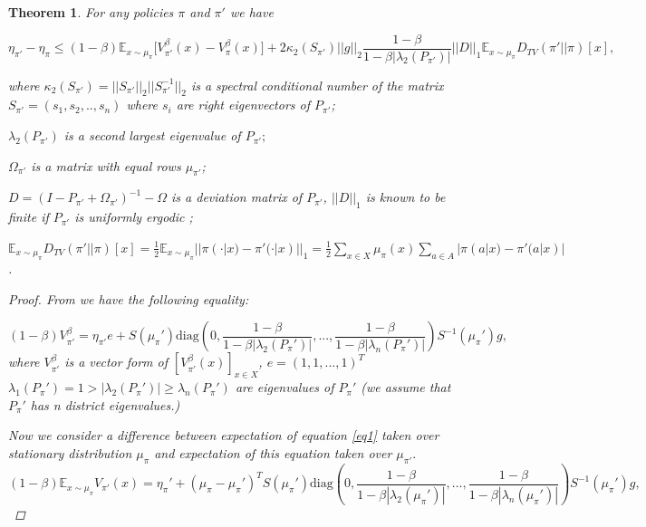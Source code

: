 \documentclass[11pt]{article}
\newcommand{\E}{\mathbb{E}}
\newtheorem{theorem}{Theorem}
\theoremstyle{definition}
\numberwithin{equation}{section}
\begin{document}
\begin{theorem}\label{thm2}
For any policies $\pi$ and $\pi'$ we have

\begin{equation}
\eta_{\pi'}-\eta_\pi  \leq  (1-\beta) \E_{x\sim\mu_\pi} \Big[V^\beta_{\pi'}(x) -V^\beta_{\pi}(x)\Big] + 2\kappa_2(S_{\pi'})||g||_2 \frac{1-\beta}{ 1 - \beta|\lambda_2(P_{\pi'})|} || D ||_1 \E_{x\sim \mu_{\pi}} D_{TV}(\pi'||\pi)[x],
\end{equation}

where $\kappa_2(S_{\pi'}) = ||S_{\pi'}||_2||S_{\pi'}^{-1}||_2$ is a spectral conditional number of the matrix  $S_{\pi'} =(s_1, s_2, .., s_n)$ where $s_i$ are right eigenvectors of $P_{\pi'}$;

 $\lambda_2(P_{\pi'})$ is a second largest eigenvalue of $P_{\pi'};$

 $\Omega_{\pi'}$ is a matrix with equal rows $\mu_{\pi'}$;

$D = (I - P_{\pi'} +\Omega_{\pi'} )^{-1} -\Omega$ is a deviation matrix of $P_{\pi'}$, $||D||_1$ is known to be finite if $P_{\pi'}$ is uniformly ergodic \cite{Kartashov1985};

$\E_{x\sim \mu_{\pi}} D_{TV}(\pi'||\pi)[x] = \frac{1}{2}\E_{x\sim \mu_{\pi}} || \pi(\cdot|x) - \pi'(\cdot|x) ||_1 =\frac{1}{2} \sum\limits_{x\in X} \mu_\pi(x) \sum\limits_{a\in A}| \pi(a|x) - \pi'(a|x)|$.
\begin{proof}

From \cite[Theorem 3.]{Baxter2001} we have the following equality:


\begin{equation}\label{eq1}
(1-\beta)  V^\beta_{\pi'} = \eta_{\pi'}e +  S(\mu_\pi') \text{diag}(0, \frac{1-\beta}{ 1 - \beta|\lambda_2(P_\pi')|},  ..., \frac{1-\beta}{ 1 - \beta|\lambda_n(P_\pi')|})S^{-1}(\mu_\pi')g,
\end{equation}
where $V_{\pi'}^\beta$ is a vector form of $[V^\beta_{\pi'}(x)]_{x\in X}$, $e = (1, 1, ..., 1)^T$
$\lambda_1(P_\pi') =  1>  |\lambda_2(P_\pi')|\geq\lambda_n(P_\pi')$ are eigenvalues of $P_\pi'$ (we assume that $P_\pi'$ has n district eigenvalues.)


Now we consider a difference between expectation of equation \ref{eq1} taken over stationary distribution $\mu_\pi$ and expectation of this equation taken over $\mu_{\pi'}.$
\begin{equation}
(1-\beta) \E_{x\sim\mu_\pi} V_{\pi'}(x) = \eta_\pi' + (\mu_\pi - \mu_\pi')^T S(\mu_\pi') \text{diag}(0, \frac{1-\beta}{ 1 - \beta|\lambda_2(\mu_\pi')|},  ..., \frac{1-\beta}{ 1 - \beta|\lambda_n(\mu_\pi')|})S^{-1}(\mu_\pi')g,
\end{equation}


\end{proof}
\end{theorem}
\end{document}
